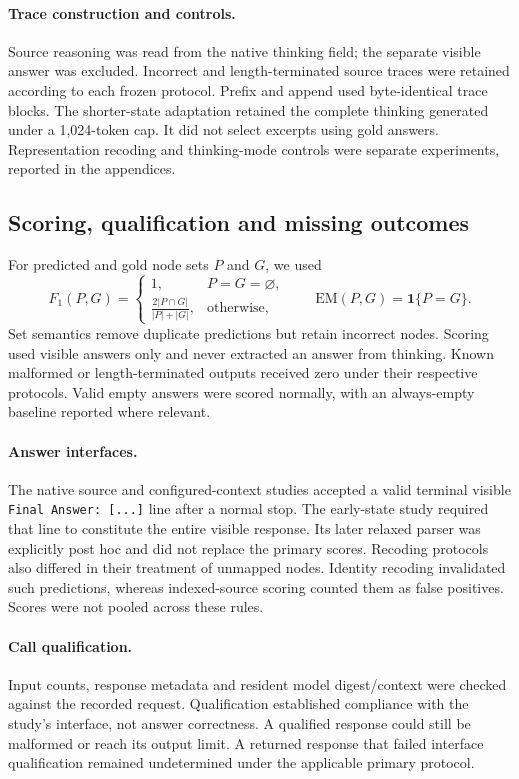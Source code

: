 
\paragraph{Trace construction and controls.} Source reasoning was read from the native thinking field; the separate visible answer was excluded. Incorrect and length-terminated source traces were retained according to each frozen protocol. Prefix and append used byte-identical trace blocks. The shorter-state adaptation retained the complete thinking generated under a 1,024-token cap. It did not select excerpts using gold answers. Representation recoding and thinking-mode controls were separate experiments, reported in the appendices.

\subsection{Scoring, qualification and missing outcomes}
For predicted and gold node sets $P$ and $G$, we used
\[
 F_1(P,G)=\begin{cases}
 1,&P=G=\varnothing,\\
 \displaystyle\frac{2|P\cap G|}{|P|+|G|},&\text{otherwise},
 \end{cases}
 \qquad \mathrm{EM}(P,G)=\mathbf{1}\{P=G\}.
\]
Set semantics remove duplicate predictions but retain incorrect nodes. Scoring used visible answers only and never extracted an answer from thinking. Known malformed or length-terminated outputs received zero under their respective protocols. Valid empty answers were scored normally, with an always-empty baseline reported where relevant.

\paragraph{Answer interfaces.} The native source and configured-context studies accepted a valid terminal visible \texttt{Final Answer: [...]} line after a normal stop. The early-state study required that line to constitute the entire visible response. Its later relaxed parser was explicitly post hoc and did not replace the primary scores. Recoding protocols also differed in their treatment of unmapped nodes. Identity recoding invalidated such predictions, whereas indexed-source scoring counted them as false positives. Scores were not pooled across these rules.

\paragraph{Call qualification.} Input counts, response metadata and resident model digest/context were checked against the recorded request. Qualification established compliance with the study's interface, not answer correctness. A qualified response could still be malformed or reach its output limit. A returned response that failed interface qualification remained undetermined under the applicable primary protocol.

